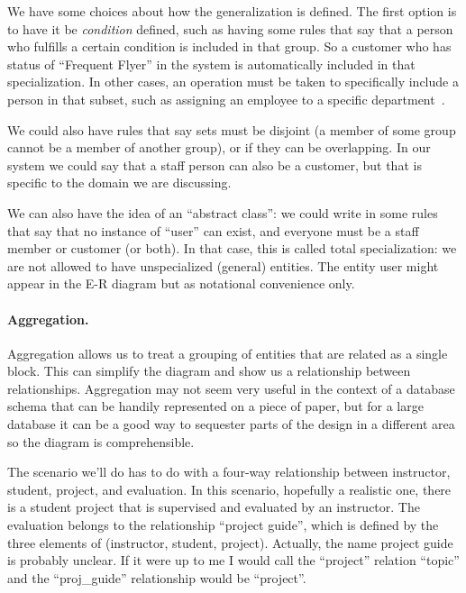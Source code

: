 We have some choices about how the generalization is defined. The first option is to have it be \textit{condition} defined, such as having some rules that say that a person who fulfills a certain condition is included in that group. So a customer who has status of ``Frequent Flyer'' in the system is automatically included in that specialization. In other cases, an operation must be taken to specifically include a person in that subset, such as assigning an employee to a specific department~\cite{dsc}. 

We could also have rules that say sets must be disjoint (a member of some group cannot be a member of another group), or if they can be overlapping. In our system we could say that a staff person can also be a customer, but that is specific  to the domain we are discussing. 

We can also have the idea of an ``abstract class'': we could write in some rules that say that no instance of ``user'' can exist, and everyone must be a staff member or customer (or both). In that case, this is called total specialization: we are not allowed to have unspecialized (general) entities. The entity user might appear in the E-R diagram but as notational convenience only.

\paragraph{Aggregation.} 

Aggregation allows us to treat a grouping of entities that are related as a single block. This can simplify the diagram and show us a relationship between relationships. Aggregation may not seem very useful in the context of a database schema that can be handily represented on a piece of paper, but for a large database it can be a good way to sequester parts of the design in a different area so the diagram is comprehensible.

The scenario we'll do has to do with a four-way relationship between instructor, student, project, and evaluation. In this scenario, hopefully a realistic one, there is a student project that is supervised and evaluated by an instructor. The evaluation belongs to the relationship ``project guide'', which is defined by the three elements of (instructor, student, project). Actually, the name project guide is probably unclear. If it were up to me I would call the ``project'' relation ``topic'' and the ``proj\_guide'' relationship would be ``project''. 

